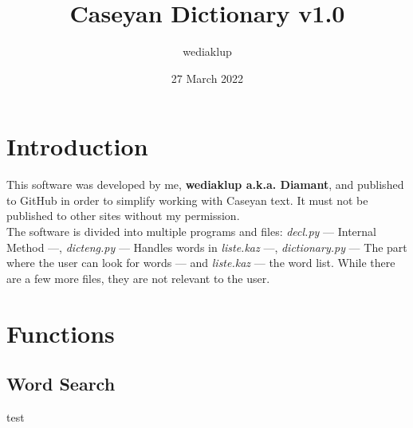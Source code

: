 \documentclass[12pt,a4paper]{article}
\author{wediaklup}
\title{Caseyan Dictionary v1.0}
\date{27 March 2022}
\begin{document}
\maketitle
\tableofcontents

\section{Introduction}
This software was developed by me, \textbf{wediaklup a.k.a. Diamant}, and published to GitHub in order to simplify working with Caseyan text. It must not be published to other sites without my permission. \\
The software is divided into multiple programs and files: \textit{decl.py} — Internal Method —, \textit{dicteng.py} — Handles words in \textit{liste.kaz} —, \textit{dictionary.py} — The part where the user can look for words — and \textit{liste.kaz} — the word list. While there are a few more files, they are not relevant to the user.

\section{Functions}
\subsection{Word Search}
test
\end{document}
